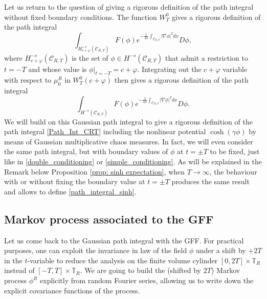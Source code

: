 \documentclass[11pt]{amsart}
\numberwithin{equation}{section}
\theoremstyle{definition}
\newcommand{\mc}{\mathcal}
\def\T{\mathbb{T}}
\begin{document}
Let us return to the question of giving a rigorous definition of the path integral without fixed boundary conditions. The function $W^0_T$ gives a rigorous definition of the path integral 
 \begin{equation}\label{simple_conditioning}
 \int_{H_{c+\varphi}^{-s}(\mc{C}_{R,T})} F(\phi) e^{-\frac{1}{4\pi} \int_{\mathcal{C}_{R,T}}|\nabla \phi|^2dx} D\phi,
 \end{equation}
where $H_{c+\varphi}^{-s}(\mc{C}_{R,T})$ is the set of $\phi \in H^{-s}(\mc{C}_{R,T})$ that admit a restriction to $t=-T$ and whose value is $\phi|_{t=-T}=c+\varphi$.
Integrating out the  $c+\varphi$ variable with respect to $\mu_0^R$ in $W^0_T(c+\varphi)$ then gives a rigorous definition of the path integral 
 \[
 \int_{H^{-s}(\mc{C}_{R,T})} F(\phi) e^{-\frac{1}{4\pi} \int_{\mathcal{C}_{R,T}}|\nabla \phi|^2dx} D\phi.\]
We will build on this Gaussian path integral to give a rigorous definition of the path integral \eqref{Path_Int_CRT} including the nonlinear potential $\cosh(\gamma \phi)$ by means of Gaussian multiplicative chaos measures. In fact, we will even consider the same path integral, but with boundary values of $\phi$ at $t=\pm T$ to be fixed, just like in \eqref{double_conditioning} or \eqref{simple_conditioning}.
As will be explained in the Remark below Proposition \ref{prop: sinh expectation},  when $T\to \infty$, the behaviour 
 with or without fixing the boundary value at $t=\pm T$  produces the same result and allows to define \eqref{path_integral_sinh}.
 
\subsection{Markov process associated to the GFF}\label{sec:markov_process_GFF} 
Let us come back to the Gaussian path integral with the GFF. For practical purposes, one can exploit the invariance in law of the field $\phi$  under a shift  by $+2T$ in the $t$-variable to reduce the analysis on the finite volume cylinder $[0,2T]\times \T_R$ instead of $[-T,T]\times \T_R$.  We are going to build the (shifted by $2T$) Markov process $\phi^R$ explicitly from random Fourier series, allowing us to write down the explicit covariance functions of the process. 
 
\end{document}
